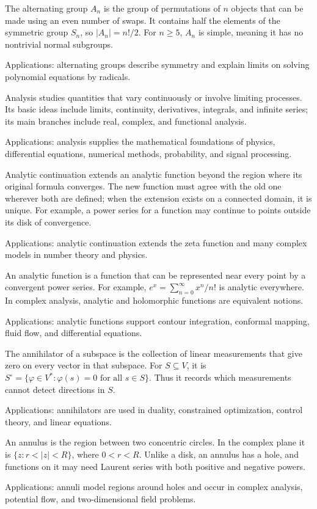 The alternating group $A_n$ is the group of permutations of $n$ objects that can be made using an even number of swaps. It contains half the elements of the symmetric group $S_n$, so $|A_n|=n!/2$. For $n\ge5$, $A_n$ is simple, meaning it has no nontrivial normal subgroups. \par\noindent Applications: alternating groups describe symmetry and explain limits on solving polynomial equations by radicals.

Analysis studies quantities that vary continuously or involve limiting processes. Its basic ideas include limits, continuity, derivatives, integrals, and infinite series; its main branches include real, complex, and functional analysis. \par\noindent Applications: analysis supplies the mathematical foundations of physics, differential equations, numerical methods, probability, and signal processing.

Analytic continuation extends an analytic function beyond the region where its original formula converges. The new function must agree with the old one wherever both are defined; when the extension exists on a connected domain, it is unique. For example, a power series for a function may continue to points outside its disk of convergence. \par\noindent Applications: analytic continuation extends the zeta function and many complex models in number theory and physics.

An analytic function is a function that can be represented near every point by a convergent power series. For example, $e^x=\sum_{n=0}^{\infty}x^n/n!$ is analytic everywhere. In complex analysis, analytic and holomorphic functions are equivalent notions. \par\noindent Applications: analytic functions support contour integration, conformal mapping, fluid flow, and differential equations.

The annihilator of a subspace is the collection of linear measurements that give zero on every vector in that subspace. For $S\subseteq V$, it is $S^\circ=\{\varphi\in V^*: \varphi(s)=0\text{ for all }s\in S\}$. Thus it records which measurements cannot detect directions in $S$. \par\noindent Applications: annihilators are used in duality, constrained optimization, control theory, and linear equations.

An annulus is the region between two concentric circles. In the complex plane it is $\{z:r<|z|<R\}$, where $0<r<R$. Unlike a disk, an annulus has a hole, and functions on it may need Laurent series with both positive and negative powers. \par\noindent Applications: annuli model regions around holes and occur in complex analysis, potential flow, and two-dimensional field problems.

